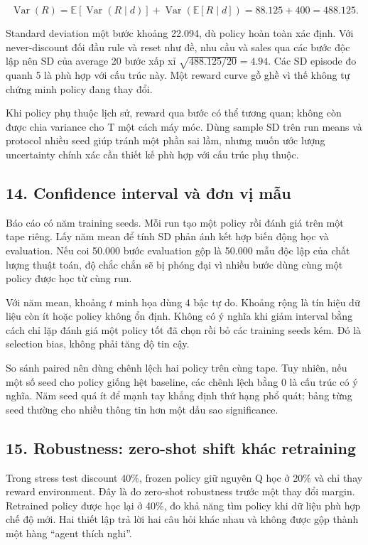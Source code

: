 \[\operatorname{Var}(R)=\mathbb E[\operatorname{Var}(R\mid d)]+\operatorname{Var}(\mathbb E[R\mid d])
=88.125+400=488.125.\]

Standard deviation một bước khoảng 22.094, dù policy hoàn toàn xác định.
Với never-discount đối đầu rule và reset như đề, nhu cầu và sales qua
các bước độc lập nên SD của average 20 bước xấp xỉ
\(\sqrt{488.125/20}=4.94\). Các SD episode đo quanh 5 là phù hợp với cấu
trúc này. Một reward curve gồ ghề vì thế không tự chứng minh policy đang
thay đổi.

Khi policy phụ thuộc lịch sử, reward qua bước có thể tương quan; không
còn được chia variance cho T một cách máy móc. Dùng sample SD trên run
means và protocol nhiều seed giúp tránh một phần sai lầm, nhưng muốn ước
lượng uncertainty chính xác cần thiết kế phù hợp với cấu trúc phụ thuộc.

\subsection{14. Confidence interval và đơn vị
mẫu}\label{confidence-interval-vuxe0-ux111ux1a1n-vux1ecb-mux1eabu}

Báo cáo có năm training seeds. Mỗi run tạo một policy rồi đánh giá trên
một tape riêng. Lấy năm mean để tính SD phản ánh kết hợp biến động học
và evaluation. Nếu coi 50.000 bước evaluation gộp là 50.000 mẫu độc lập
của chất lượng thuật toán, độ chắc chắn sẽ bị phóng đại vì nhiều bước
dùng cùng một policy được học từ cùng run.

Với năm mean, khoảng \(t\) minh họa dùng 4 bậc tự do. Khoảng rộng là tín
hiệu dữ liệu còn ít hoặc policy không ổn định. Không có ý nghĩa khi giảm
interval bằng cách chỉ lặp đánh giá một policy tốt đã chọn rồi bỏ các
training seeds kém. Đó là selection bias, không phải tăng độ tin cậy.

So sánh paired nên dùng chênh lệch hai policy trên cùng tape. Tuy nhiên,
nếu một số seed cho policy giống hệt baseline, các chênh lệch bằng 0 là
cấu trúc có ý nghĩa. Năm seed quá ít để mạnh tay khẳng định thứ hạng phổ
quát; bảng từng seed thường cho nhiều thông tin hơn một dấu sao
significance.

\subsection{15. Robustness: zero-shot shift khác
retraining}\label{robustness-zero-shot-shift-khuxe1c-retraining}

Trong stress test discount 40\%, frozen policy giữ nguyên Q học ở 20\%
và chỉ thay reward environment. Đây là đo zero-shot robustness trước một
thay đổi margin. Retrained policy được học lại ở 40\%, đo khả năng tìm
policy khi dữ liệu phù hợp chế độ mới. Hai thiết lập trả lời hai câu hỏi
khác nhau và không được gộp thành một hàng ``agent thích nghi''.


